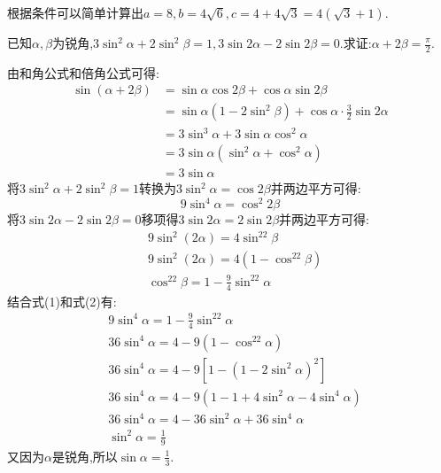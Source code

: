 \begin{questions}
\begin{solution}
		根据条件可以简单计算出$a=8, b=4\sqrt{6}, c=4+4\sqrt{3}=4(\sqrt{3} + 1)$.
	\end{solution}

	\question[20] 已知$\alpha,\beta$为锐角,$3\sin^2\alpha + 2\sin^2\beta=1, 3\sin2\alpha - 2\sin2\beta
		=0$.求证:$\alpha+2\beta=\frac{\pi}2.$

	\begin{proofsolution}
		由和角公式和倍角公式可得:
		\begin{align*}
			\sin(\alpha + 2\beta) & = \sin\alpha\cos2\beta + \cos\alpha\sin2\beta                      \\
			                      & = \sin\alpha(1 - 2\sin^2\beta) + \cos\alpha\cdot\frac32\sin2\alpha \\
			                      & = 3\sin^3\alpha  + 3\sin\alpha\cos^2\alpha                         \\
			                      & = 3\sin\alpha(\sin^2\alpha + \cos^2\alpha)                         \\
			                      & = 3\sin\alpha
		\end{align*}
		将$3\sin^2\alpha + 2\sin^2\beta=1$转换为$3\sin^2\alpha=\cos2\beta$并两边平方可得:
		\begin{equation*}
			9\sin^4\alpha = \cos^2{2\beta} \tag{1}
		\end{equation*}
		将$3\sin2\alpha-2\sin2\beta=0$移项得$3\sin2\alpha=2\sin2\beta$并两边平方可得:
		\begin{align*}
			 & 9\sin^2(2\alpha)  = 4\sin^22\beta               \\
			 & 9\sin^2(2\alpha)  = 4(1-\cos^22\beta)           \\
			 & \cos^22\beta = 1 - \frac94\sin^22\alpha \tag{2}
		\end{align*}
		结合式(1)和式(2)有:
		\begin{align*}
			 & 9\sin^4\alpha = 1 - \frac94\sin^22\alpha                 \\
			 & 36\sin^4\alpha = 4 - 9(1-\cos^22\alpha)                  \\
			 & 36\sin^4\alpha = 4 - 9[1-(1-2\sin^2\alpha)^2]            \\
			 & 36\sin^4\alpha = 4 - 9(1-1+4\sin^2\alpha -4\sin^4\alpha) \\
			 & 36\sin^4\alpha = 4 - 36\sin^2\alpha + 36\sin^4\alpha     \\
			 & \sin^2\alpha = \frac19
		\end{align*}
		又因为$\alpha$是锐角,所以$\sin\alpha=\frac13$.


\end{proofsolution}
\end{questions}
